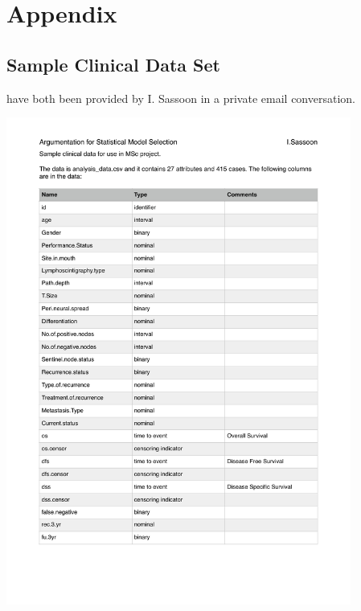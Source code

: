 
\section{Appendix}
\label{app:a}



\subsection{Sample Clinical Data Set}
\label{app:dataset}

 have both been provided by I. Sassoon in a private email conversation.

{
	\centering
	\includegraphics[page=1,width=0.85\textwidth]{appendix/analysis_data.pdf}

}
